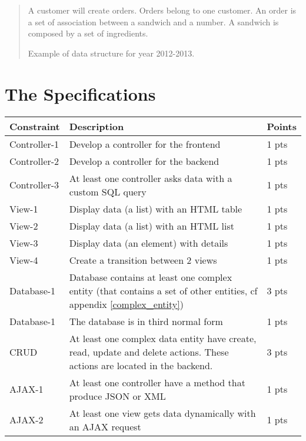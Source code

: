 \documentclass{article}         %
\newcounter{notetab}
\newcommand{\zero}{\setcounter{notetab}{0}}
\newcommand{\ntm}{\footnotemark\addtocounter{notetab}{1}}
\begin{document}
\begin{quotation}
A customer will create orders. Orders belong to one customer. An order is a set of association between a sandwich and a number. A sandwich is composed by a set of ingredients. \par
\raggedleft Example of data structure for year 2012-2013.
\end{quotation}



\section{The Specifications}
\label{specs}

\zero
\begin{tabular}{|p{2cm}|p{10cm}|p{1cm}|}
  \hline
  Constraint & Description & Points \\

  \hline
  Controller-1 & Develop a controller for the frontend & 1 pts \\
  Controller-2 & Develop a controller for the backend & 1 pts \\
  Controller-3 & At least one controller asks data with a custom SQL query & 1 pts \\

  \hline
  View-1 & Display data (a list) with an HTML table & 1 pts \\
  View-2 & Display data (a list) with an HTML list & 1 pts \\
  View-3 & Display data (an element) with details & 1 pts \\
  View-4 & Create a transition between 2 views & 1 pts \\

  \hline
  Database-1 & Database contains at least one complex entity (that contains a set of other entities, cf appendix \ref{complex_entity}) & 3 pts \\
  Database-1 & The database is in third normal form \ntm & 1 pts \\

  \hline
  CRUD & At least one complex data entity have create, read, update and delete actions. These actions are located in the backend. & 3 pts \\

  \hline
  AJAX-1 & At least one controller have a method that produce JSON or XML & 1 pts \\
  AJAX-2 & At least one view gets data dynamically with an AJAX request & 1 pts \\


\end{tabular}
\end{document}
